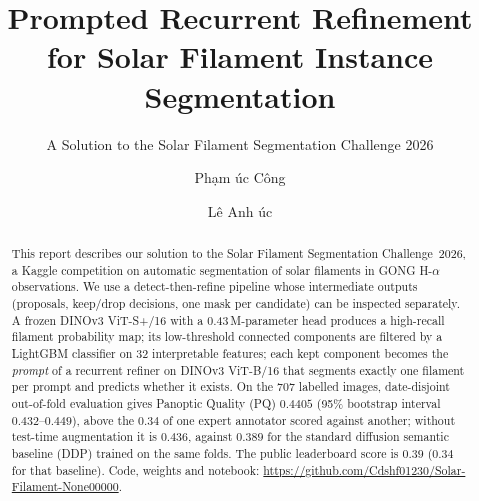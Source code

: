 \documentclass[sigconf]{acmart}
\begin{document}
\title{Prompted Recurrent Refinement for Solar Filament Instance Segmentation}  %
\subtitle{A Solution to the Solar Filament Segmentation Challenge 2026} %


\author{Ph\d{a}m \DJ\'{u}c C\^{o}ng}

\author{L\^{e} Anh \DJ\'{u}c}

\begin{abstract}
    This report describes our solution to the Solar Filament Segmentation Challenge~2026, a Kaggle competition on automatic segmentation of solar filaments in GONG H-$\alpha$ observations. We use a detect-then-refine
    pipeline whose intermediate outputs (proposals, keep/drop decisions, one mask per candidate) can be inspected
    separately. A frozen DINOv3 ViT-S+/16 with a 0.43\,M-parameter head produces a high-recall filament probability
    map; its low-threshold connected components are filtered by a LightGBM classifier on 32 interpretable features;
    each kept component becomes the \emph{prompt} of a recurrent refiner on DINOv3 ViT-B/16 that segments exactly one
    filament per prompt and predicts whether it exists. On the 707 labelled images, date-disjoint out-of-fold
    evaluation gives Panoptic Quality (PQ) $0.4405$ (95\% bootstrap interval $0.432$--$0.449$), above the $0.34$ of one
    expert annotator scored against another; without test-time augmentation it is $0.436$, against $0.389$ for the
    standard diffusion semantic baseline (DDP) trained on the same folds. The public leaderboard score is $0.39$ ($0.34$ for
    that baseline). Code, weights and notebook:
    \url{https://github.com/Cdshf01230/Solar-Filament-None00000}.
\end{abstract}

\maketitle

\ifguideStyle
{}
\par\medskip
\fi
\end{document}

